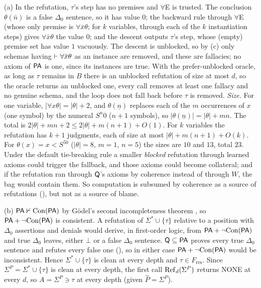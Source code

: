 (a) In the refutation, $\tau$'s step has no premises and $\forall$E is trusted. The conclusion $\theta(\bar n)$ is a false $\Delta_0$ sentence, so it has value $0$; the backward rule through $\forall$E (whose only premise is $\forall\bar x\theta$; for $k$ variables, through each of the $k$ instantiation steps) gives $\forall\bar x\theta$ the value $0$; and the descent outputs $\tau$'s step, whose (empty) premise set has value $1$ vacuously. The descent is unblocked, so by (c) only schemas having $\vdash\forall\bar x\theta$ as an instance are removed, and these are fallacies; no axiom of $\mathsf{PA}$ is one, since its instances are true. With the prefer-unblocked oracle, as long as $\tau$ remains in $B$ there is an unblocked refutation of size at most $d$, so the oracle returns an unblocked one, every call removes at least one fallacy and no genuine schema, and the loop does not fall back before $\tau$ is removed. \emph{Size.} For one variable, $|\forall x\theta|=|\theta|+2$, and $\theta(\underline n)$ replaces each of the $m$ occurrences of $x$ (one symbol) by the numeral $S^n0$ ($n+1$ symbols), so $|\theta(\underline n)|=|\theta|+mn$. The total is $2|\theta|+mn+2\le2|\theta|+m(n+1)+O(1)$. For $k$ variables the refutation has $k+1$ judgments, each of size at most $|\theta|+m(n+1)+O(k)$. For $\theta(x)=x<S^50$ ($|\theta|=8$, $m=1$, $n=5$) the sizes are $10$ and $13$, total $23$. Under the default tie-breaking rule a smaller \emph{blocked} refutation through learned axioms could trigger the fallback, and those axioms could become collateral; and if the refutation ran through $\mathsf{Q}$'s axioms by coherence instead of through $W$, the bag would contain them. So computation is subsumed by coherence as a source of refutations (), but not as a source of blame.

(b) $\mathsf{PA}\nvdash\mathrm{Con}(\mathsf{PA})$ by G\"odel's second incompleteness theorem \citep{godel1931formal}, so $\mathsf{PA}+\neg\mathrm{Con}(\mathsf{PA})$ is consistent. A refutation of $\Sigma^*\cup\{\tau\}$ relative to a position with $\Delta_0$ assertions and denials would derive, in first-order logic, from $\mathsf{PA}+\neg\mathrm{Con}(\mathsf{PA})$ and true $\Delta_0$ leaves, either $\bot$ or a false $\Delta_0$ sentence. $\mathsf{Q}\subseteq\mathsf{PA}$ proves every true $\Delta_0$ sentence and refutes every false one (), so in either case $\mathsf{PA}+\neg\mathrm{Con}(\mathsf{PA})$ would be inconsistent. Hence $\Sigma^*\cup\{\tau\}$ is clean at every depth and $\tau\in F_{\mathrm{res}}$. Since $\Sigma^P=\Sigma^*\cup\{\tau\}$ is clean at every depth, the first call $\mathrm{Ref}_d(\Sigma^P)$ returns NONE at every $d$, so $A=\Sigma^P\ni\tau$ at every depth (given $\hat P=\Sigma^P$).

